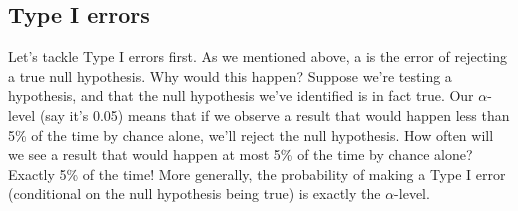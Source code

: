 
\subsection{Type I errors}

Let's tackle Type I errors first. As we mentioned above, a  is the error of rejecting a true null hypothesis. Why would this happen? Suppose we're testing a hypothesis, and that the null hypothesis we've identified is in fact true. Our $\alpha$-level (say it's 0.05) means that if we observe a result that would happen less than 5\% of the time by chance alone, we'll reject the null hypothesis. How often will we see a result that would happen at most 5\% of the time by chance alone? Exactly 5\% of the time!  More generally, the probability of making a Type I error (conditional on the null hypothesis being true) is exactly the $\alpha$-level.





